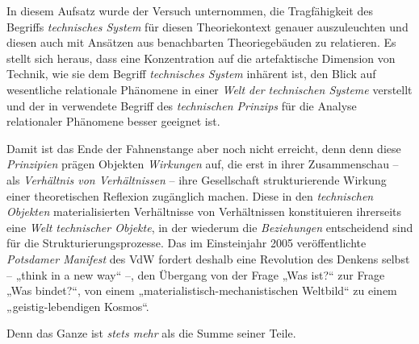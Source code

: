 \documentclass[11pt,a4paper]{article}
\begin{document}
In diesem Aufsatz wurde der Versuch unternommen, die Tragfähigkeit des
Begriffs \emph{technisches System} für diesen Theoriekontext genauer
auszuleuchten und diesen auch mit Ansätzen aus benachbarten Theoriegebäuden zu
relatieren.  Es stellt sich heraus, dass eine Konzentration auf die
artefaktische Dimension von Technik, wie sie dem Begriff  \emph{technisches
  System} inhärent ist, den Blick auf wesentliche relationale Phänomene in
einer \emph{Welt der technischen Systeme} verstellt und der in
\cite{Shpakovsky2010} verwendete Begriff des \emph{technischen Prinzips} für
die Analyse relationaler Phänomene besser geeignet ist.

Damit ist das Ende der Fahnenstange aber noch nicht erreicht, denn denn diese
\emph{Prinzipien} prägen Objekten \emph{Wirkungen} auf, die erst in ihrer
Zusammenschau -- als \emph{Verhältnis von Verhältnissen} -- ihre Gesellschaft
strukturierende Wirkung einer theoretischen Reflexion zugänglich machen.
Diese in den \emph{technischen Objekten} materialisierten Verhältnisse von
Verhältnissen konstituieren ihrerseits eine \emph{Welt technischer Objekte},
in der wiederum die \emph{Beziehungen} entscheidend sind für die
Strukturierungsprozesse.  Das im Einsteinjahr 2005 veröffentlichte
\emph{Potsdamer Manifest} \cite{Duerr2005} des VdW fordert deshalb eine
Revolution des Denkens selbst -- „think in a new way“ --, den Übergang von der
Frage „Was ist?“ zur Frage „Was bindet?“, von einem
„materialistisch-mechanistischen Weltbild“ zu einem „geistig-lebendigen
Kosmos“.

Denn das Ganze ist \emph{stets mehr} als die Summe seiner Teile.
\end{document}
